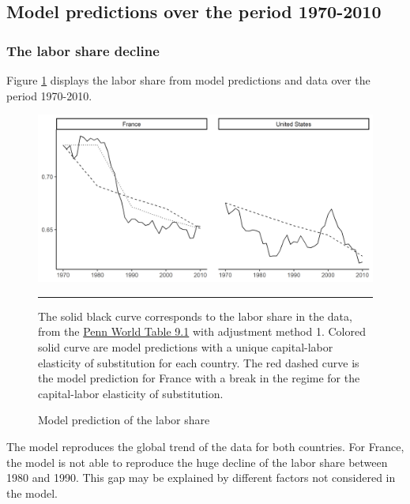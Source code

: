 \subsection{Model predictions over the period 1970-2010}\label{subsec:model_pred}

\subsubsection{The labor share decline}

Figure \ref{fig:pred_data_7010} displays the labor share from model predictions and data over the period 1970-2010.
\begin{figure}[tb]
	\centering
	\includegraphics[width=1\linewidth]{../result/baseline7010.png}
	\caption{Model prediction of the labor share}
	\label{fig:pred_data_7010}
	\vspace{.5ex}
	\hrule
	\vspace{-4ex}
	\justify\singlespacing\footnotesize The solid black curve corresponds to the labor share in the data, from the \href{https://www.rug.nl/ggdc/productivity/pwt/}{Penn World Table 9.1} with adjustment method 1. Colored solid curve are model predictions with a unique capital-labor elasticity of substitution for each country. The red dashed curve is the model prediction for France with a break in the regime for the capital-labor elasticity of substitution.
\end{figure}
The model reproduces the global trend of the data for both countries. For France, the model is not able to reproduce the huge decline of the labor share between 1980 and 1990. This gap may be explained by different factors not considered in the model.
